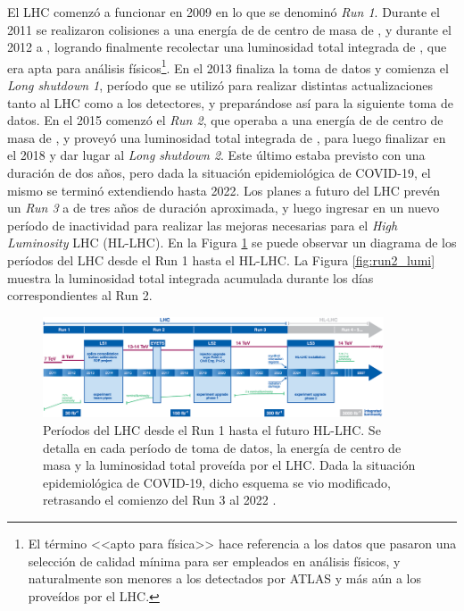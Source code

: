 El LHC comenzó a funcionar en 2009 en lo que se denominó \textit{Run 1}. Durante el 2011 se realizaron colisiones a una energía de de centro de masa de , y durante el 2012 a , logrando finalmente recolectar una luminosidad total integrada de  \cite{DAPR-2011-01,DAPR-2013-01}, que era apta para análisis físicos\footnote{El término <<apto para física>> hace referencia a los datos que pasaron una selección de calidad mínima para ser empleados en análisis físicos, y naturalmente son menores a los detectados por ATLAS y más aún a los proveídos por el LHC.}. En el 2013 finaliza la toma de datos y comienza el \textit{Long shutdown 1}, período que se utilizó para realizar distintas actualizaciones tanto al LHC como a los detectores, y preparándose así para la siguiente toma de datos. En el 2015 comenzó el \textit{Run 2}, que operaba a una energía de de centro de masa de , y proveyó una luminosidad total integrada de  \cite{lumi_13tev}, para luego finalizar en el 2018 y dar lugar al \textit{Long shutdown 2}. Este último estaba previsto con una duración de dos años, pero dada la situación epidemiológica de COVID-19, el mismo se terminó extendiendo hasta 2022.
Los planes a futuro del LHC prevén un \textit{Run 3} a  de tres años de duración aproximada, y luego ingresar en un nuevo período de inactividad para realizar las mejoras necesarias para el \textit{High Luminosity} LHC (HL-LHC). En la Figura \ref{fig:lhc_periods} se puede observar un diagrama de los períodos del LHC desde el Run 1 hasta el HL-LHC. La Figura \ref{fig:run2_lumi} muestra la luminosidad total integrada acumulada durante los días correspondientes al Run 2.

\begin{figure}
  \centering
  \includegraphics[width=0.9\textwidth]{images/lhc/lhc_periods.png}
  \caption{Períodos del LHC desde el Run 1 hasta el futuro HL-LHC. Se detalla en cada período de toma de datos, la energía de centro de masa y la luminosidad total proveída por el LHC. Dada la situación epidemiológica de COVID-19, dicho esquema se vio modificado, retrasando el comienzo del Run 3 al 2022 \cite{lhc_periods}.}
  \label{fig:lhc_periods}
\end{figure}

